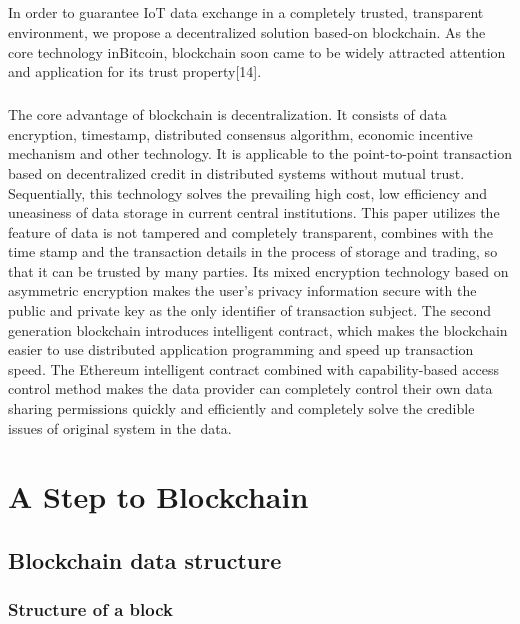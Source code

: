 \paragraph{}In order to guarantee IoT data exchange in a completely trusted, transparent environment, we propose a decentralized solution based-on blockchain. As the core technology inBitcoin, blockchain soon came to be widely attracted attention and application for its trust property[14].
\paragraph{}The core advantage of blockchain is decentralization. It consists of data encryption, timestamp, distributed consensus algorithm, economic incentive mechanism and other technology. It is applicable to the point-to-point transaction based on decentralized credit in distributed systems without mutual trust. Sequentially, this technology solves the prevailing high cost, low efficiency and uneasiness of data storage in current central institutions. This paper utilizes the feature of data is not tampered and completely transparent, combines with the time stamp and the transaction details in the process of storage and trading, so that it can be trusted by many parties. Its mixed encryption technology based on asymmetric encryption makes the user's privacy information secure with the public and private key as the only identifier of transaction subject. The second generation blockchain introduces intelligent contract, which makes the blockchain easier to use distributed application programming and speed up transaction speed. The Ethereum intelligent contract combined with capability-based access control method
makes the data provider can completely control their own
data sharing permissions quickly and efficiently and
completely solve the credible issues of original system in the
data.

\chapter{A Step to Blockchain}

\section{Blockchain data structure}

\subsection{Structure of a block}

